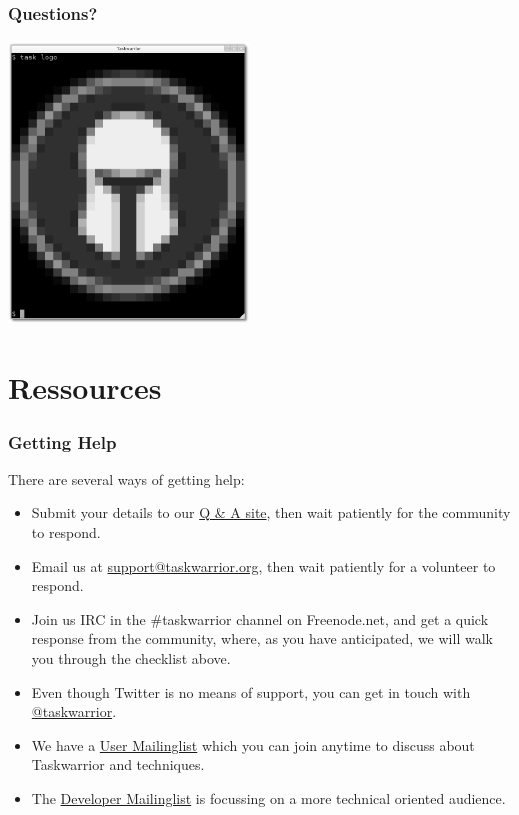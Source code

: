 \documentclass[t]{beamer}
\begin{document}
\begin{frame}[fragile]\frametitle{Questions?}
    \begin{center}
        \includegraphics[width=6.4cm,height=7.5cm]{task_logo.png}
    \end{center}
\end{frame}

\section{Ressources}

\begin{frame}[fragile]\frametitle{Getting Help}
    \vfill
    There are several ways of getting help:

    \begin{itemize}
        \item Submit your details to our \href{https://answers.tasktools.org}{Q \& A site}, then wait patiently for the community to respond.
        \item Email us at \href{mailto:support@taskwarrior.org}{support@taskwarrior.org}, then wait patiently for a volunteer to respond.
        \item Join us IRC in the \#taskwarrior channel on Freenode.net, and get a quick response from the community, where, as you have anticipated, we will walk you through the checklist above.
        \item Even though Twitter is no means of support, you can get in touch with \href{https://twitter.com/taskwarrior}{@taskwarrior}.
        \item We have a \href{https://groups.google.com/forum/\#!forum/taskwarrior-user}{User Mailinglist} which you can join anytime to discuss about Taskwarrior and techniques.
        \item The \href{https://groups.google.com/forum/\#!forum/taskwarrior-dev}{Developer Mailinglist} is focussing on a more technical oriented audience.
    \end{itemize}
\end{frame}
\end{document}
